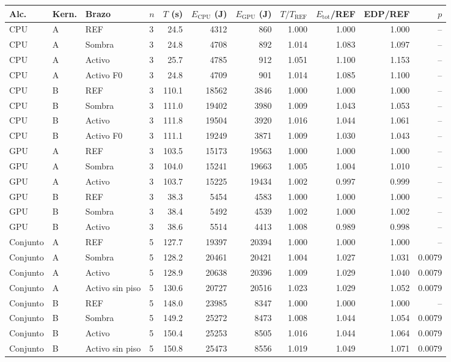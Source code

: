 \begin{tabular}{@{}llllrrrrrrr@{}}
\toprule
\textbf{Alc.} & \textbf{Kern.} & \textbf{Brazo} & \textbf{$n$} & \textbf{$T$ (s)} & \textbf{$E_{\mathrm{CPU}}$ (J)} & \textbf{$E_{\mathrm{GPU}}$ (J)} & \textbf{$T/T_{\mathrm{REF}}$} & \textbf{$E_{\mathrm{tot}}$/REF} & \textbf{EDP/REF} & \textbf{$p$} \\
\midrule
CPU & A & REF & 3 & 24.5 & 4312 & 860 & 1.000 & 1.000 & 1.000 & -- \\
CPU & A & Sombra & 3 & 24.8 & 4708 & 892 & 1.014 & 1.083 & 1.097 & -- \\
CPU & A & Activo & 3 & 25.7 & 4785 & 912 & 1.051 & 1.100 & 1.153 & -- \\
CPU & A & Activo F0 & 3 & 24.8 & 4709 & 901 & 1.014 & 1.085 & 1.100 & -- \\
\midrule
CPU & B & REF & 3 & 110.1 & 18562 & 3846 & 1.000 & 1.000 & 1.000 & -- \\
CPU & B & Sombra & 3 & 111.0 & 19402 & 3980 & 1.009 & 1.043 & 1.053 & -- \\
CPU & B & Activo & 3 & 111.8 & 19504 & 3920 & 1.016 & 1.044 & 1.061 & -- \\
CPU & B & Activo F0 & 3 & 111.1 & 19249 & 3871 & 1.009 & 1.030 & 1.043 & -- \\
\midrule
GPU & A & REF & 3 & 103.5 & 15173 & 19563 & 1.000 & 1.000 & 1.000 & -- \\
GPU & A & Sombra & 3 & 104.0 & 15241 & 19663 & 1.005 & 1.004 & 1.010 & -- \\
GPU & A & Activo & 3 & 103.7 & 15225 & 19434 & 1.002 & 0.997 & 0.999 & -- \\
\midrule
GPU & B & REF & 3 & 38.3 & 5454 & 4583 & 1.000 & 1.000 & 1.000 & -- \\
GPU & B & Sombra & 3 & 38.4 & 5492 & 4539 & 1.002 & 1.000 & 1.002 & -- \\
GPU & B & Activo & 3 & 38.6 & 5514 & 4413 & 1.008 & 0.989 & 0.998 & -- \\
\midrule
Conjunto & A & REF & 5 & 127.7 & 19397 & 20394 & 1.000 & 1.000 & 1.000 & -- \\
Conjunto & A & Sombra & 5 & 128.2 & 20461 & 20421 & 1.004 & 1.027 & 1.031 & 0.0079 \\
Conjunto & A & Activo & 5 & 128.9 & 20638 & 20396 & 1.009 & 1.029 & 1.040 & 0.0079 \\
Conjunto & A & Activo sin piso & 5 & 130.6 & 20727 & 20516 & 1.023 & 1.029 & 1.052 & 0.0079 \\
\midrule
Conjunto & B & REF & 5 & 148.0 & 23985 & 8347 & 1.000 & 1.000 & 1.000 & -- \\
Conjunto & B & Sombra & 5 & 149.2 & 25272 & 8473 & 1.008 & 1.044 & 1.054 & 0.0079 \\
Conjunto & B & Activo & 5 & 150.4 & 25253 & 8505 & 1.016 & 1.044 & 1.064 & 0.0079 \\
Conjunto & B & Activo sin piso & 5 & 150.8 & 25473 & 8556 & 1.019 & 1.049 & 1.071 & 0.0079 \\
\bottomrule
\end{tabular}
